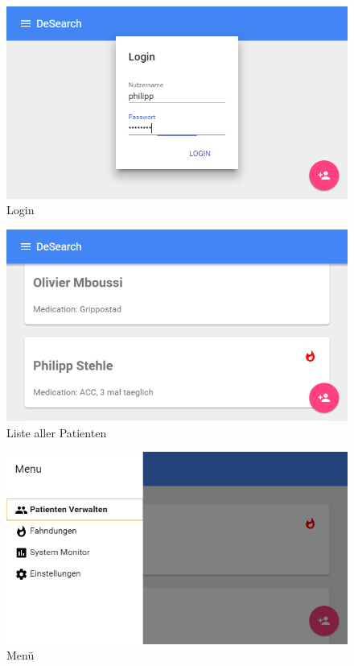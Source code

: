 \begin{figure}
	\centering
	\includegraphics[width=1.0\linewidth]{images/ui/login}
	\caption{Login}
	\label{img:ui/login}
\end{figure}

\begin{figure}
	\centering
	\includegraphics[width=1.0\linewidth]{images/ui/personenliste}
	\caption{Liste aller Patienten}
	\label{img:ui/personenliste}
\end{figure}

\begin{figure}
	\centering
	\includegraphics[width=1.0\linewidth]{images/ui/menu}
	\caption{Menü}
	\label{img:ui/menu}
\end{figure}

